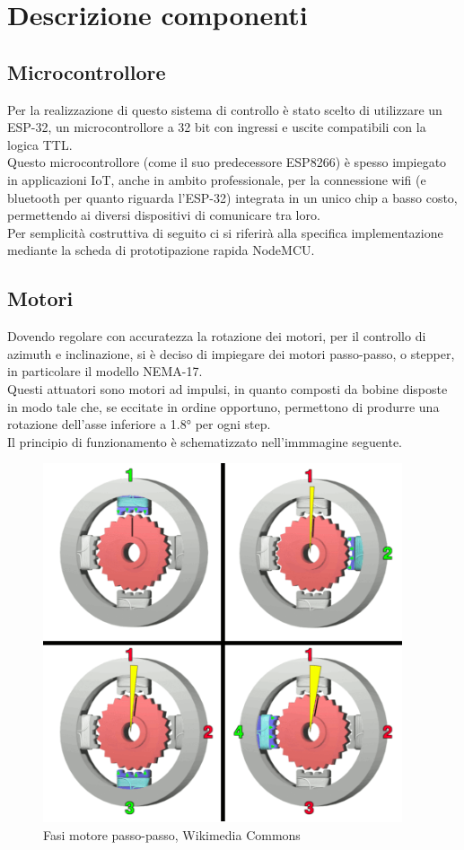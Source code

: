 \documentclass[12pt]{article}
\begin{document}
\section{Descrizione componenti}
    \subsection{Microcontrollore}
    Per la realizzazione di questo sistema di controllo è stato scelto di utilizzare un ESP-32, un microcontrollore a 32 bit con ingressi e uscite compatibili con la logica TTL.\\
    Questo microcontrollore (come il suo predecessore ESP8266) è spesso impiegato in applicazioni IoT, anche in ambito professionale, per la connessione wifi (e bluetooth per quanto riguarda l'ESP-32) integrata in un unico chip a basso costo, permettendo ai diversi dispositivi di comunicare tra loro.\\
    Per semplicità costruttiva di seguito ci si riferirà alla specifica implementazione me\-dian\-te la scheda di prototipazione rapida NodeMCU.
    
    \subsection{Motori}
    Dovendo regolare con accuratezza la rotazione dei motori, per il controllo di azimuth e inclinazione, si è deciso di impiegare dei motori passo-passo, o stepper, in particolare il modello NEMA-17.\\
    Questi attuatori sono motori ad impulsi, in quanto composti da bobine disposte in modo tale che, se eccitate in ordine opportuno, permettono di produrre una rotazione dell'asse inferiore a 1.8° per ogni step.\\
    Il principio di funzionamento è schematizzato nell'immmagine seguente.\\
    
    
    
    \begin{figure}[h]
    \centering
        \includegraphics[width=300pt]{Draws/Animations/StepperMotor.png}
        \caption{Fasi motore passo-passo, Wikimedia Commons \protect\footnotemark}
    \end{figure}
    
\end{document}
